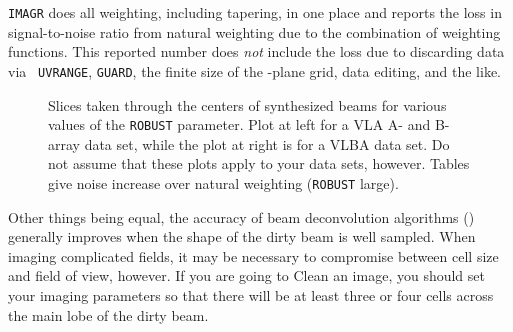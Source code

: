      {\tt IMAGR} does all weighting, including tapering, in one place
and reports the loss in signal-to-noise ratio from natural weighting
due to the combination of weighting functions.  This reported number
does {\it not\/} include the loss due to discarding data via {\tt
UVRANGE}, {\tt GUARD}, the finite size of the \uv-plane grid, data
editing, and the like.

\begin{figure}
\centering
\caption[Affect of {\tt ROBUST} parameter on beams.]{Slices taken
through the centers of synthesized beams for various values of the
{\tt ROBUST} parameter.  Plot at left for a VLA A- and B-array data
set, while the plot at right is for a VLBA data set.  Do not assume
that these plots apply to your data sets, however.  Tables give noise
increase over natural weighting ({\tt ROBUST} large).}
\label{fig:robust}
\end{figure}


     Other things being equal, the accuracy of beam deconvolution
algorithms () generally improves when the shape of the dirty
beam is well sampled.  When imaging complicated fields, it may be
necessary to compromise between cell size and field of view, however.
If you are going to Clean an image, you should set your imaging
parameters so that there will be at least three or four cells across
the main lobe of the dirty beam.

